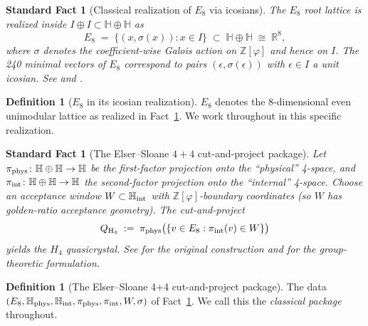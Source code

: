 \documentclass[11pt, a4paper]{amsart}
\newtheorem{fact}[theorem]{Standard Fact}
\theoremstyle{definition}
\newtheorem{definition}[theorem]{Definition}
\newcommand{\R}{\mathbb{R}}
\newcommand{\HH}{\mathbb{H}}
\newcommand{\Ophi}{\mathbb{Z}[\varphi]}
\begin{document}
\begin{fact}[Classical realization of $E_8$ via icosians]
\label{fact:E8-iso}
The $E_8$ root lattice is realized inside $I \oplus I \subset
\HH \oplus \HH$ as
\[
  E_8 \;=\; \{(x, \sigma(x)) : x \in I\}
  \;\subset\; \HH \oplus \HH \;\cong\; \R^{8},
\]
where $\sigma$ denotes the coefficient-wise Galois action on
$\Ophi$ and hence on $I$. The 240 minimal vectors of $E_8$
correspond to pairs $(\epsilon, \sigma(\epsilon))$ with
$\epsilon \in I$ a unit icosian.
See \cite[Ch.~8, Eq.~(17), Table~8.1]{ConwaySloane} and
\cite[Thm.~4.1]{MoodyPatera}.
\end{fact}

\begin{definition}[$E_8$ in its icosian realization]
\label{def:E8-iso}
$E_8$ denotes the 8-dimensional even unimodular lattice as
realized in Fact~\ref{fact:E8-iso}. We work throughout in this
specific realization.
\end{definition}

\begin{fact}[The Elser--Sloane $4+4$ cut-and-project package]
\label{fact:cap}
Let $\pi_{\rm phys} \colon \HH \oplus \HH \to \HH$ be the
first-factor projection onto the ``physical'' 4-space, and
$\pi_{\rm int} \colon \HH \oplus \HH \to \HH$ the second-factor
projection onto the ``internal'' 4-space. Choose an acceptance
window $W \subset \HH_{\rm int}$ with $\Ophi$-boundary
coordinates (so $W$ has golden-ratio acceptance geometry).
The cut-and-project
\[
  Q_{\rm H_4} \;:=\; \pi_{\rm phys}\bigl(\{v \in E_8 :
  \pi_{\rm int}(v) \in W\}\bigr)
\]
yields the $H_4$ quasicrystal. See \cite{ElserSloane} for the
original construction and
\cite[Thm.~4.1, Prop.~4.2]{MoodyPatera} for the group-theoretic
formulation.
\end{fact}

\begin{definition}[The Elser--Sloane 4+4 cut-and-project package]
\label{def:cap}
The data $(E_8, \HH_{\rm phys}, \HH_{\rm int}, \pi_{\rm phys},
\pi_{\rm int}, W, \sigma)$ of Fact~\ref{fact:cap}. We call this
the \emph{classical package} throughout.
\end{definition}
\end{document}
